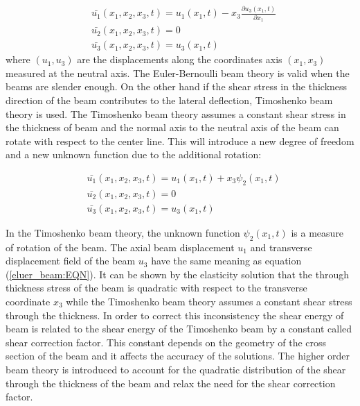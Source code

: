 \begin{equation}
\begin{aligned}
& \bar {u_1} (x_1,x_2,x_3,t)=u_1 (x_1,t)-x_3  \frac{\partial u_3 (x_1,t)} {\partial x_1} \\
& \bar {u_2} (x_1,x_2,x_3,t)=0 \\
& \bar {u_3} (x_1,x_2,x_3,t)=u_3 (x_1,t)
\end{aligned}
\label{eluer_beam:EQN}
\end{equation}
where  $(u_1,u_3)$ are the displacements along the coordinates axis $({x_1}, {x_3})$ measured at the neutral axis.
The Euler-Bernoulli beam theory is valid when the beams are slender enough.
On the other hand if the shear stress in the thickness direction of the beam contributes to the lateral deflection, Timoshenko beam theory is used.
The Timoshenko beam theory assumes a constant shear stress in the thickness of beam and the normal axis to the neutral axis of the beam can rotate with respect to the center line.
This will introduce a new degree of freedom and a new unknown function due to the additional rotation:

\begin{equation}
\begin{aligned}
& \bar {u_1} (x_1,x_2,x_3,t)=u_1 (x_1,t)+x_3  \psi_2(x_1,t)  \\
& \bar {u_2} (x_1,x_2,x_3,t)=0 \\
& \bar {u_3} (x_1,x_2,x_3,t)=u_3 (x_1,t)
\end{aligned}
\label{timoshenko_beam:EQN}
\end{equation}

In the Timoshenko beam theory, the unknown function $\psi_2(x_1,t)$ is a measure of rotation of the beam.
The axial beam displacement ${u_1}$ and transverse displacement field of the beam ${u_3}$ have the same meaning as equation (\ref{eluer_beam:EQN}).
It can be shown by the elasticity solution that the through thickness stress of the beam is quadratic with respect to the transverse coordinate $x_3$ while the Timoshenko beam theory assumes a constant shear stress through the thickness.
In order to correct this inconsistency the shear energy of beam is related to the shear energy of the Timoshenko beam by a constant called shear correction factor.
This constant depends on the geometry of the cross section of the beam and it affects the accuracy of the solutions.
The higher order beam theory is introduced to account for the quadratic distribution of the shear through the thickness of the beam and relax the need for the shear correction factor.


